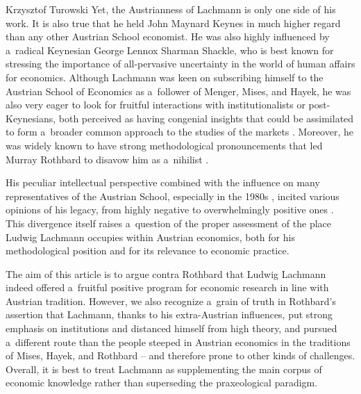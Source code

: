 \begin{artengenv}{Krzysztof Turowski}
Yet, the Austrianness of Lachmann is only one side of his work.
It is also true that he held John Maynard Keynes in much higher regard than any other Austrian School economist. He was also highly influenced by a~radical Keynesian George Lennox Sharman Shackle, who is best known for stressing the importance of all-pervasive uncertainty in the world of human affairs for economics.
Although Lachmann was keen on subscribing himself to the Austrian School of Economics as a~follower of Menger, Mises, and Hayek, he was also very eager to look for fruitful interactions with institutionalists or post-Keynesians, both perceived as having congenial insights that could be assimilated to form a~broader common approach to the studies of the markets \parencite[8]{lavoie-introduction}.
Moreover, he was widely known to have strong methodological pronouncements that led Murray Rothbard to disavow him as a~nihilist \parencite*[52--53]{rothbard-present}.

His peculiar intellectual perspective combined with the influence on many representatives of the Austrian School, especially in the 1980s \parencite[139--140]{vaughn1998austrian}, incited various opinions of his legacy, from highly negative \parencite[82]{rothbard-present} to overwhelmingly positive ones \parencite[1]{lavoie-introduction}.
This divergence itself raises a~question of the proper assessment of the place Ludwig Lachmann occupies within Austrian economics, both for his methodological position and for its relevance to economic practice.

The aim of this article is to argue contra Rothbard that Ludwig Lachmann indeed offered a~fruitful positive program for economic research in line with Austrian tradition.
However, we also recognize a~grain of truth in Rothbard's assertion that Lachmann, thanks to his extra-Austrian influences, put strong emphasis on institutions and distanced himself from high theory, and pursued a~different route than the people steeped in Austrian economics in the traditions of Mises, Hayek, and Rothbard -- and therefore prone to other kinds of challenges.
Overall, it is best to treat Lachmann as supplementing the main corpus of economic knowledge rather than superseding the praxeological paradigm.


\end{artengenv}
